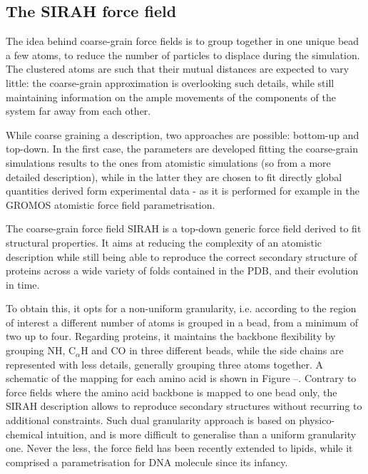 \subsection{The SIRAH force field}
The idea behind coarse-grain force fields is to group together in one unique bead a few atoms, to reduce the number of particles to displace during the simulation. The clustered atoms are such that their mutual distances are expected to vary little: the coarse-grain approximation is overlooking such details, while still maintaining information on the ample movements of the components of the system far away from each other.

While coarse graining a description, two approaches are possible: bottom-up and top-down. In the first case, the parameters are developed fitting the coarse-grain simulations results to the ones from atomistic simulations (so from a more detailed description), while in the latter they are chosen to fit directly global quantities derived form experimental data - as it is performed for example in the GROMOS atomistic force field parametrisation.

The coarse-grain force field SIRAH \cite{--} is a top-down generic force field derived to fit structural properties. It aims at reducing the complexity of an atomistic description while still being able to reproduce the correct secondary structure of proteins across a wide variety of folds contained in the PDB, and their evolution in time.

To obtain this, it opts for a non-uniform granularity, i.e. according to the region of interest a different number of atoms is grouped in a bead, from a minimum of two up to four. Regarding proteins, it maintains the backbone flexibility by grouping NH, C$_\alpha$H and CO in three different beads, while the side chains are represented with less details, generally grouping three atoms together. A schematic of the mapping for each amino acid is shown in Figure --. Contrary to force fields where the amino acid backbone is mapped to one bead only, the SIRAH description allows to reproduce secondary structures without recurring to additional constraints.
%
Such dual granularity approach is based on physico-chemical intuition, and is more difficult to generalise than a uniform granularity one. Never the less, the force field has been recently extended to lipids, while it comprised a parametrisation for DNA molecule since its infancy.

